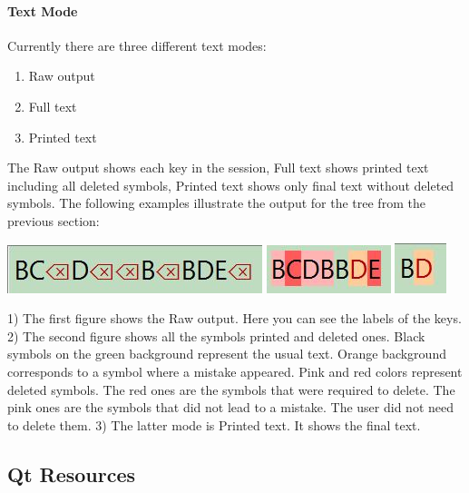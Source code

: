 \documentclass{article}
\begin{document}
\paragraph{Text Mode}

Currently there are three different text modes:
\begin{enumerate}
\item Raw output
\item Full text
\item Printed text
\end{enumerate}
The Raw output shows each key in the session, Full text shows printed text including all deleted symbols, Printed text shows only final text without deleted symbols. The following examples illustrate the output for the tree from the previous section:
\begin{center}
\includegraphics[scale = 0.6]{Figures/raw_session.jpg}
\quad
\includegraphics[scale = 0.6]{Figures/full_text.jpg}
\quad
\includegraphics[scale = 0.6]{Figures/printed_text.jpg}

1) The first figure shows the Raw output. Here you can see the labels of the keys. 2) The second figure shows all the symbols printed and deleted ones. Black symbols on the green background represent the usual text. Orange background corresponds to a symbol where a mistake appeared. Pink and red colors represent deleted symbols. The red ones are the symbols that were required to delete. The pink ones are the symbols that did not lead to a mistake. The user did not need to delete them. 3) The latter mode is Printed text. It shows the final text.
\end{center}



\subsection{Qt Resources}
\end{document}
